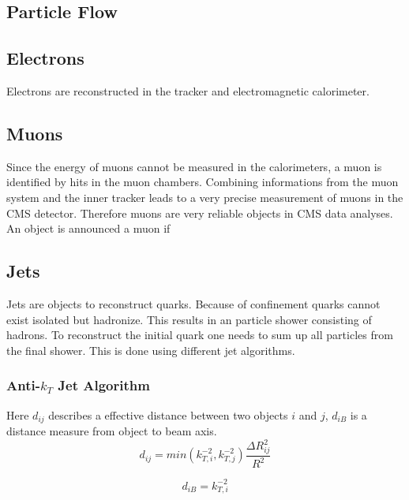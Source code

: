 \subsection{Particle Flow}
\subsection{Electrons}
	Electrons are reconstructed in the tracker and electromagnetic calorimeter.
\subsection{Muons}
	Since the energy of muons cannot be measured in the calorimeters, a muon is identified by hits in the muon chambers. Combining informations from the muon system and the inner tracker leads to a very precise measurement of muons in the CMS detector. Therefore muons are very reliable objects in CMS data analyses. An object is announced a muon if %
\subsection{Jets}
	Jets are objects to reconstruct quarks. Because of confinement quarks cannot exist isolated but hadronize. This results in an particle shower consisting of hadrons. To reconstruct the initial quark one needs to sum up all particles from the final shower. This is done using different jet algorithms.
\subsubsection{Anti-$k_T$ Jet Algorithm}

	
	\cite{antikt}
	
	Here $d_{ij}$ describes a effective distance between two objects $i$ and $j$, $d_{iB}$ is a distance measure from object to beam axis.
	\begin{equation}
	d_{ij} = min (k_{T,i}^{-2}, k_{T,j}^{-2})  \frac{\Delta R_{ij}^2}{R^2}
	\label{dij}
	\end{equation}
	
	\begin{equation}
	d_{iB} = k_{T,i}^{-2}
	\label{iB}
	\end{equation}
	
	
